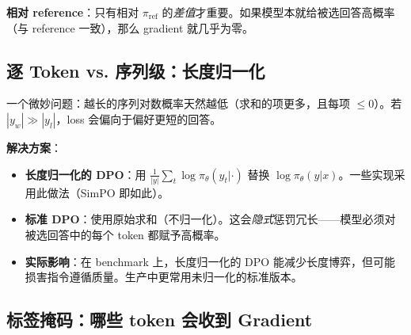 \textbf{相对 reference}：只有相对 $\pi_{\text{ref}}$ 的\emph{差值}才重要。如果模型本就给被选回答高概率（与 reference 一致），那么 gradient 就几乎为零。

\subsection{逐 Token vs. 序列级：长度归一化}
\label{per-token-vs.-sequence-level-length-normalization}

一个微妙问题：越长的序列对数概率天然越低（求和的项更多，且每项 $\leq 0$）。若 $|y_w| \gg |y_l|$，loss 会偏向于偏好更短的回答。

\textbf{解决方案}：

\begin{itemize}
  \item \textbf{长度归一化的 DPO}：用 $\frac{1}{|y|}\sum_t \log\pi_\theta(y_t|\cdot)$ 替换 $\log\pi_\theta(y|x)$。一些实现采用此做法（SimPO 即如此）。
  \item \textbf{标准 DPO}：使用原始求和（不归一化）。这会\emph{隐式}惩罚冗长——模型必须对被选回答中的每个 token 都赋予高概率。
  \item \textbf{实际影响}：在 benchmark 上，长度归一化的 DPO 能减少长度博弈，但可能损害指令遵循质量。生产中更常用未归一化的标准版本。
\end{itemize}

\subsection{标签掩码：哪些 token 会收到 Gradient}
\label{label-masking-what-gets-gradients}

